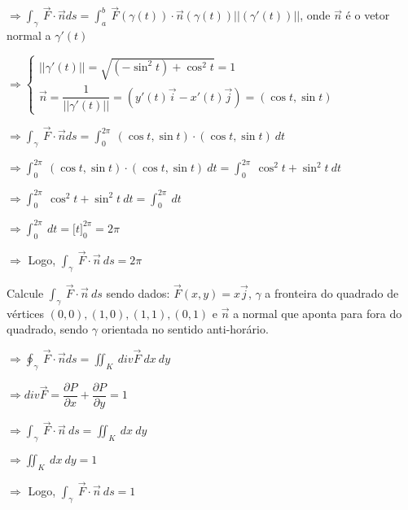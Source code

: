 \documentclass[11pt,a4paper]{article}
\begin{document}
\begin{enumerate}
{{		$\Rightarrow \displaystyle\int_\gamma\ \vec{F}\cdot \vec{n}ds = \displaystyle\int_{a}^{b}\ \vec{F}(\gamma(t)) \cdot \vec{n}(\gamma(t)) ||(\gamma'(t))||$, onde $\vec{n}$ é o vetor normal a $\gamma'(t)$
		
		$\Rightarrow \begin{cases}
		||\gamma'(t)|| = \sqrt{(-\sin^2 t) + \cos^2 t} = 1 \\
		\vec{n} = \dfrac{1}{||\gamma'(t)||} = (y'(t)\vec{i} - x'(t)\vec{j}) = (\cos t, \sin t)
		\end{cases}$
		
		$\Rightarrow \displaystyle\int_\gamma\ \vec{F}\cdot \vec{n}ds = \displaystyle\int_{0}^{2\pi}\ (\cos t, \sin t)\cdot (\cos t, \sin t)\ dt$
		
		$\Rightarrow \displaystyle\int_{0}^{2\pi}\ (\cos t, \sin t)\cdot (\cos t, \sin t)\ dt = \displaystyle\int_{0}^{2\pi}\ \cos^2 t + \sin^2 t\ dt $
		
		$\Rightarrow \displaystyle\int_{0}^{2\pi}\ \cos^2 t + \sin^2 t\ dt = \displaystyle\int_{0}^{2\pi}\ dt$
		
		$\Rightarrow \displaystyle\int_{0}^{2\pi}\ dt = \Big[t]_0^{2\pi} = 2\pi$
		
		$\Rightarrow$ Logo, $\displaystyle\int_\gamma\ \vec{F} \cdot \vec{n}\ ds = 2\pi$
		
		\item Calcule $\displaystyle\int_\gamma\ \vec{F} \cdot \vec{n}\ ds$ sendo dados: $\vec{F}(x,y) = x\vec{j}$, $\gamma$ a fronteira do quadrado de vértices $(0,0),(1,0),(1,1),(0,1)$ e $\vec{n}$ a normal que aponta para fora do quadrado, sendo $\gamma$ orientada no sentido anti-horário.
		
		$\Rightarrow \displaystyle\oint_\gamma\ \vec{F}\cdot \vec{n}ds = \displaystyle\iint_K\ div\vec{F}\ dx\ dy$
		
		$\Rightarrow div \vec{F} = \dfrac{\partial P}{\partial x} + \dfrac{\partial P}{\partial y} = 1$
		
		$\Rightarrow \displaystyle\int_\gamma\ \vec{F} \cdot \vec{n}\ ds = \displaystyle\iint_K\ dx\ dy$
		
		$\Rightarrow \displaystyle\iint_K\ dx\ dy = 1$
		
		$\Rightarrow$ Logo, $\displaystyle\int_\gamma\ \vec{F} \cdot \vec{n}\ ds = 1$
		
}}
\end{enumerate}
\end{document}
